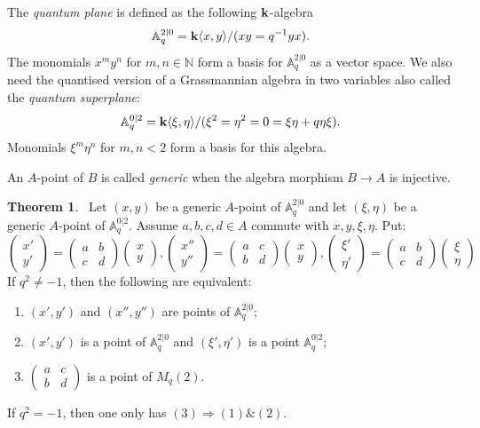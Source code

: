 \documentclass[8pt]{article}
\theoremstyle{definition}
\theoremstyle{definition}
\newtheorem{theorem}{Theorem}[section]
\theoremstyle{definition}
\theoremstyle{definition}
\theoremstyle{definition}
\theoremstyle{definition}
\theoremstyle{definition}
\theoremstyle{definition}
\theoremstyle{definition}
\theoremstyle{definition}
\theoremstyle{definition}
\theoremstyle{definition}
\theoremstyle{definition}
\theoremstyle{definition}
\theoremstyle{question}
\begin{document}
The \emph{quantum plane} is defined as the following ${\bf k}$-algebra
\[
\mathbb{A}^{2|0}_q = {\bf k}\langle x, y\rangle/(x y = q^{-1} y x).
\]
The monomials $x^m y^n$ for $m, n \in \mathbb{N}$ form a basis for $\mathbb{A}^{2|0}_q$ as a vector space.
We also need the quantised version of a Grassmannian algebra in two variables also called the \emph{quantum superplane}:
\[
\mathbb{A}^{0|2}_q = {\bf k}\langle \xi, \eta \rangle/(\xi^2 = \eta^2 = 0 = \xi \eta + q \eta \xi).
\]
Monomials $\xi^m \eta^n$ for $m, n < 2$ form a basis for this algebra.

An $A$-point of $B$ is called \emph{generic} when the algebra morphism $B \to A$ is injective.

\begin{theorem}~\label{a:point:theorem}
  Let $(x, y)$ be a generic $A$-point of $\mathbb{A}^{2|0}_q$
  and let $(\xi, \eta)$ be a generic $A$-point of $\mathbb{A}^{0|2}_q$.
  Assume $a, b,c,d \in A$ commute with $x, y, \xi, \eta$.
  Put:
  \[ 
  \begin{pmatrix} x' \\ y' \end{pmatrix} = \begin{pmatrix} a & b \\ c & d \end{pmatrix} \begin{pmatrix} x \\ y \end{pmatrix}, 
  \begin{pmatrix} x'' \\ y'' \end{pmatrix} = \begin{pmatrix} a & c \\ b & d \end{pmatrix} \begin{pmatrix} x \\ y \end{pmatrix},
  \begin{pmatrix} \xi' \\ \eta' \end{pmatrix} = \begin{pmatrix} a & b \\ c & d \end{pmatrix} \begin{pmatrix} \xi \\ \eta \end{pmatrix}
  \]
  If $q^2 \neq - 1$, then the following are equivalent:
  \begin{enumerate}
    \item $(x', y')$ and $(x'', y'')$ are points of $\mathbb{A}^{2|0}_q$;
    \item $(x', y')$ is a point of $\mathbb{A}^{2|0}_q$ and $(\xi', \eta')$
    is a point $\mathbb{A}^{0|2}_q$;
    \item $\begin{pmatrix} a & c \\ b & d \end{pmatrix}$ is a point of $M_q(2)$.
  \end{enumerate}
  If $q^2 = - 1$, then one only has $(3) \Rightarrow (1) \& (2)$.
\end{theorem}
\end{document}
